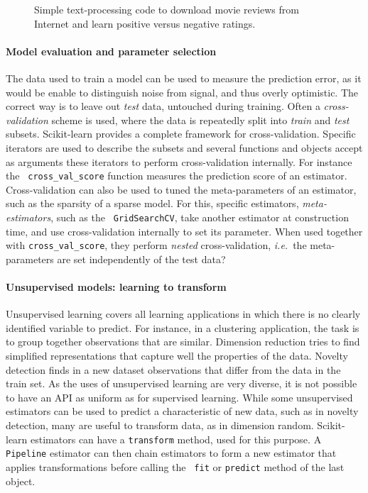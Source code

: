 \documentclass[a4paper]{article}
\begin{document}
\begin{figure}[b]

\caption{Simple text-processing code to download movie reviews from
Internet and learn positive versus negative ratings.}
\end{figure}


\paragraph{Model evaluation and parameter selection}
%
The data used to train a model can be used to measure the prediction
error, as it would be enable to distinguish noise from signal, and thus
overly optimistic. The correct way is to leave out \emph{test} data,
untouched during training. Often a \emph{cross-validation} scheme is
used, where the data is repeatedly split into \emph{train} and
\emph{test} subsets. Scikit-learn provides a complete framework for
cross-validation. Specific iterators are used to describe the subsets and
several functions and objects accept as arguments these iterators to
perform cross-validation internally. For instance the {\tt
cross\_val\_score} function measures the prediction score of an
estimator. Cross-validation can also be used to tuned the meta-parameters
of an estimator, such as the sparsity of a sparse model. For this,
specific estimators, \emph{meta-estimators}, such as the {\tt
GridSearchCV}, take another estimator at construction time, and use
cross-validation internally to set its parameter. When used together with
{\tt cross\_val\_score}, they perform \emph{nested} cross-validation,
\emph{i.e.}~the meta-parameters are set independently of the test data?

\paragraph{Unsupervised models: learning to transform}
%
Unsupervised learning covers all learning applications in which there is
no clearly identified variable to predict. For instance, in a clustering
application, the task is to group together observations that are similar.
Dimension reduction tries to find simplified representations that capture
well the properties of the data. Novelty detection finds in a new dataset
observations that differ from the data in the train set. As the uses of
unsupervised learning are very diverse, it is not possible to have an API
as uniform as for supervised learning. While some unsupervised
estimators can be used to predict a characteristic of new data, such as
in novelty detection, many are useful to transform data, as in dimension
random. Scikit-learn estimators can have a {\tt transform} method, used
for this purpose. A {\tt Pipeline} estimator can then chain estimators to
form a new estimator that applies transformations before calling the {\tt
fit} or {\tt predict} method of the last object.
\end{document}
